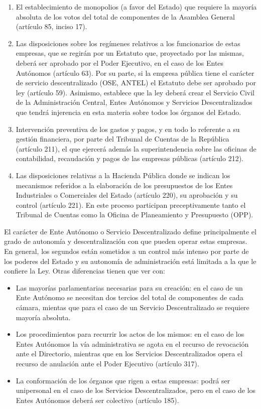 \documentclass[
  12pt,
  spanish,
]{book}
\providecommand{\tightlist}{%
  \setlength{\itemsep}{0pt}\setlength{\parskip}{0pt}}
\begin{document}
\begin{enumerate}
\def\labelenumi{\arabic{enumi}.}
\item
  El establecimiento de monopolios (a favor del Estado) que requiere la
  mayoría absoluta de los votos del total de componentes de la Asamblea
  General (artículo 85, inciso 17).
\item
  Las disposiciones sobre los regímenes relativos a los funcionarios de
  estas empresas, que se regirán por un Estatuto que, proyectado por las
  mismas, deberá ser aprobado por el Poder Ejecutivo, en el caso de los
  Entes Autónomos (artículo 63). Por su parte, si la empresa pública
  tiene el carácter de servicio descentralizado (OSE, ANTEL) el Estatuto
  debe ser aprobado por ley (artículo 59). Asimismo, establece que la
  ley deberá crear el Servicio Civil de la Administración Central, Entes
  Autónomos y Servicios Descentralizados que tendrá injerencia en esta
  materia sobre todos los órganos del Estado.
\item
  Intervención preventiva de los gastos y pagos, y en todo lo referente
  a su gestión financiera, por parte del Tribunal de Cuentas de la
  República (artículo 211), el que ejercerá además la superintendencia
  sobre las oficinas de contabilidad, recaudación y pagos de las
  empresas públicas (artículo 212).
\item
  Las disposiciones relativas a la Hacienda Pública donde se indican los
  mecanismos referidos a la elaboración de los presupuestos de los Entes
  Industriales o Comerciales del Estado (artículo 220), su aprobación y
  su control (artículo 221). En este proceso participan preceptivamente
  tanto el Tribunal de Cuentas como la Oficina de Planeamiento y
  Presupuesto (OPP).
\end{enumerate}

El carácter de Ente Autónomo o Servicio Descentralizado define
principalmente el grado de autonomía y descentralización con que pueden
operar estas empresas. En general, los segundos están sometidos a un
control más intenso por parte de los poderes del Estado y su autonomía
de administración está limitada a la que le confiere la Ley. Otras
diferencias tienen que ver con:

\begin{itemize}
\tightlist
\item
  Las mayorías parlamentarias necesarias para su creación: en el caso de
  un Ente Autónomo se necesitan dos tercios del total de componentes de
  cada cámara, mientas que para el caso de un Servicio Descentralizado
  se requiere mayoría absoluta.
\item
  Los procedimientos para recurrir los actos de los mismos: en el caso
  de los Entes Autónomos la vía administrativa se agota en el recurso de
  revocación ante el Directorio, mientras que en los Servicios
  Descentralizados opera el recurso de anulación ante el Poder Ejecutivo
  (artículo 317).
\item
  La conformación de los órganos que rigen a estas empresas: podrá ser
  unipersonal en el caso de los Servicios Descentralizados, pero en el
  caso de los Entes Autónomos deberá ser colectivo (artículo 185).
\end{itemize}
\end{document}
